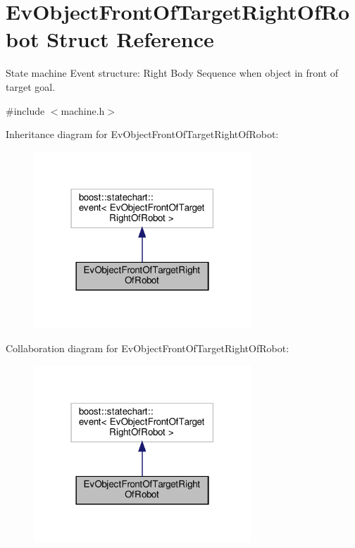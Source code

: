 \hypertarget{structEvObjectFrontOfTargetRightOfRobot}{}\section{Ev\+Object\+Front\+Of\+Target\+Right\+Of\+Robot Struct Reference}
\label{structEvObjectFrontOfTargetRightOfRobot}


State machine Event structure\+: Right Body Sequence when object in front of target goal.  




{\ttfamily \#include $<$machine.\+h$>$}



Inheritance diagram for Ev\+Object\+Front\+Of\+Target\+Right\+Of\+Robot\+:
\nopagebreak
\begin{figure}[H]
\begin{center}
\leavevmode
\includegraphics[width=231pt]{structEvObjectFrontOfTargetRightOfRobot__inherit__graph}
\end{center}
\end{figure}


Collaboration diagram for Ev\+Object\+Front\+Of\+Target\+Right\+Of\+Robot\+:
\nopagebreak
\begin{figure}[H]
\begin{center}
\leavevmode
\includegraphics[width=231pt]{structEvObjectFrontOfTargetRightOfRobot__coll__graph}
\end{center}
\end{figure}


